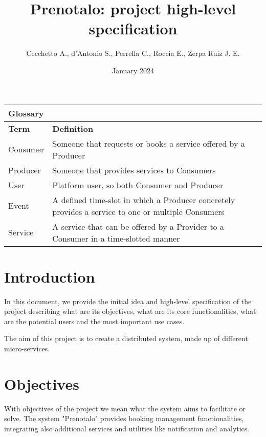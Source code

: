 \documentclass{article}
\title{Prenotalo: project high-level specification}
\author{Cecchetto A., d'Antonio S., Perrella C., Roccia E., Zerpa Ruiz J. E.}
\date{January 2024}
\begin{document}
\maketitle

\begin{table}[!h]
\centering
\begin{tabular}{l l}
\multicolumn{2}{l}{\textbf{Glossary}} \\
\hline
\textbf{Term} & \textbf{Definition} \\
\hline
Consumer & Someone that requests or books a service offered by a Producer \\
\hline
Producer & Someone that provides services to Consumers \\
\hline
User & Platform user, so both Consumer and Producer \\
\hline
Event & A defined time-slot in which a Producer concretely provides a service
	to one or multiple Consumers\\
\hline
Service & A service that can be offered by a Provider to a Consumer in a
	time-slotted manner\\ \hline
\end{tabular}

\end{table}


\section{Introduction}
In this document, we provide the initial idea and high-level specification of
the project describing what are its objectives, what are its core
functionalities, what are the potential users and the most important use cases.

The aim of this project is to create a distributed system, made up of different
micro-services. 

\section{Objectives}
With objectives of the project we mean what the system aims to facilitate or
solve. The system "Prenotalo" provides booking management functionalities,
integrating also additional services and utilities like notification and analytics.
\end{document}
